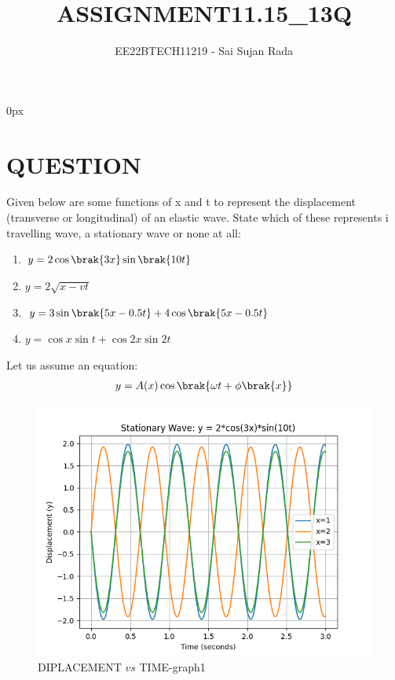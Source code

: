 \documentclass[journal,12pt,twocolumn]{IEEEtran}
\theoremstyle{remark}
\begin{document}
\parindent 0px

\title{ASSIGNMENT11.15\_13Q}
\author{EE22BTECH11219 - Sai Sujan Rada$^{}$%
}
\maketitle
\newpage
\bigskip
\section*{QUESTION}
Given below are some functions of x and t to 
represent the displacement (transverse
or longitudinal) of an elastic wave. State which of these represents \brak i travelling
wave,  a stationary wave or  none at all: \\
\begin{enumerate}
\item $y = 2\cos \brak{3x} \sin \brak{10t}$
\item $y=2\sqrt{x-vt}$
\item $y = 3\sin \brak{5x - 0.5t} + 4\cos \brak{5x - 0.5t}$
\item $y = \cos x \sin t + \cos 2x \sin 2t$
\end{enumerate}
\solution 
\fi

Let us assume an equation:
\begin{align}
y=A(x)\cos \brak{\omega t+\phi\brak {x}}
\end{align}

\begin{figure}[ht]
                        \centering
                        \includegraphics[width=\columnwidth]{figs/a.png}
                        \caption{DIPLACEMENT $vs$ TIME-graph1}
                        \label{fig:1}
\end{figure}
\end{document}
